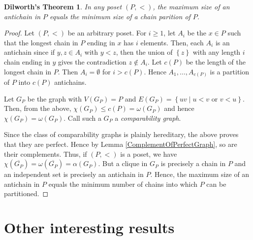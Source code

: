 \documentclass[12pt]{article}
\theoremstyle{plain}
\newtheorem*{Dilworth}{Dilworth's Theorem}
\theoremstyle{definition}
\theoremstyle{remark}
\newcommand{\set}[1]{\left\{ #1 \right\}}
\newcommand{\setbs}[2]{\left\{ #1 \mid #2 \right\}}
\begin{document}
\begin{Dilworth}
In any poset $(P, <)$, the maximum size of an antichain in $P$ equals the minimum size of a chain parition of $P$.
\end{Dilworth}
\begin{proof}
Let $(P, <)$ be an arbitrary poset.  For $i \geq 1$, let $A_i$ be the $x \in P$ such that the longest chain in $P$ ending in $x$ has $i$ elements.  Then, each $A_i$ is an antichain since if $y, z \in A_i$ with $y < z$, then the union of $\set{z}$ with any length $i$ chain ending in $y$ gives the contradiction $z \not \in A_i$.  Let $c(P)$ be the length of the longest chain in $P$. Then $A_i = \emptyset$ for $i > c(P)$.  Hence $A_1, \ldots, A_{c(P)}$ is a partition of $P$ into $c(P)$ antichains.

Let $G_P$ be the graph with $V(G_P) = P$ and $E(G_P) = \setbs{uv}{u < v \text{ or } v < u}$.  Then, from the above, $\chi(G_P) \leq c(P) = \omega(G_P)$ and hence $\chi(G_P) = \omega(G_P)$.  Call such a $G_P$ a \emph{comparability graph}.

Since the class of comparability graphs is plainly hereditary, the above proves that they are perfect.  Hence by Lemma \ref{ComplementOfPerfectGraph}, so are their complements.  Thus, if $(P, <)$ is a poset, we have $\chi(\overline{G_P}) = \omega(\overline{G_P}) = \alpha(G_P)$.  But a clique in $G_P$ is precisely a chain in $P$ and an independent set is precisely an antichain in $P$.  Hence, the maximum size of an antichain in $P$ equals the minimum number of chains into which $P$ can be partitioned.
\end{proof}

\section{Other interesting results}
\end{document}
